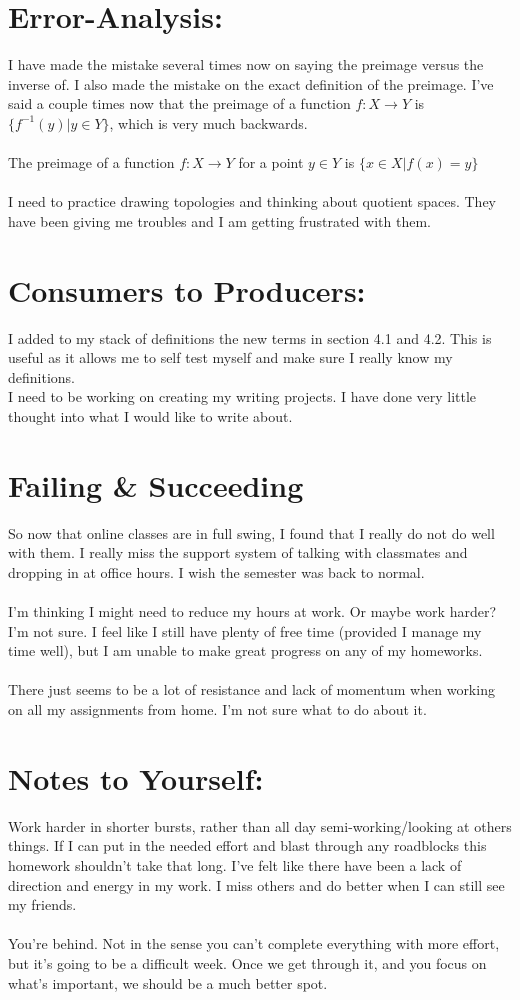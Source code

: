 \documentclass[11pt]{article}
\begin{document}
\section*{Error-Analysis:}
I have made the mistake several times now on saying the preimage versus the inverse of. I also made the mistake on the exact definition of the preimage. I've said a couple times now that the preimage of a function $f:X\to Y$ is $\{f^{-1}(y)|y\in Y\}$, which is very much backwards. \\
\\
The preimage of a function $f:X\to Y$ for a point $ y\in Y $ is $ \{x\in X|f(x)=y\} $\\
\\
I need to practice drawing topologies and thinking about quotient spaces. They have been giving me troubles and I am getting frustrated with them.
\section*{Consumers to Producers:}
I added to my stack of definitions the new terms in section 4.1 and 4.2. This is useful as it allows me to self test myself and make sure I really know my definitions.\\
I need to be working on creating my writing projects. I have done very little thought into what I would like to write about.

\section*{Failing \& Succeeding}
So now that online classes are in full swing, I found that I really do not do well with them. I really miss the support system of talking with classmates and dropping in at office hours. I wish the semester was back to normal. \\
\\
I'm thinking I might need to reduce my hours at work. Or maybe work harder? I'm not sure. I feel like I still have plenty of free time (provided I manage my time well), but I am unable to make great progress on any of my homeworks. \\
\\
There just seems to be a lot of resistance and lack of momentum when working on all my assignments from home. I'm not sure what to do about it.

\section*{Notes to Yourself:}
Work harder in shorter bursts, rather than all day semi-working/looking at others things. If I can put in the needed effort and blast through any roadblocks this homework shouldn't take that long. I've felt like there have been a lack of direction and energy in my work. I miss others and do better when I can still see my friends. \\
\\
You're behind. Not in the sense you can't complete everything with more effort, but it's going to be a difficult week. Once we get through it, and you focus on what's important, we should be a much better spot.
\end{document}
